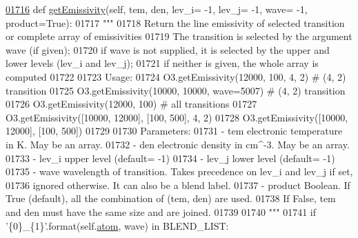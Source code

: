 \begin{DoxyCode}
\hypertarget{classpyneb_1_1core_1_1pynebcore_1_1_atom_l01716}{}\hyperlink{classpyneb_1_1core_1_1pynebcore_1_1_atom_aaf4e84a9d5f835e6284bd9302314f775}{01716}     \textcolor{keyword}{def }\hyperlink{classpyneb_1_1core_1_1pynebcore_1_1_atom_aaf4e84a9d5f835e6284bd9302314f775}{getEmissivity}(self, tem, den, lev\_i= -1, lev\_j= -1, wave= -1, product=True):
01717         \textcolor{stringliteral}{"""}
01718 \textcolor{stringliteral}{        Return the line emissivity of selected transition or complete array of emissivities}
01719 \textcolor{stringliteral}{        The transition is selected by the argument wave (if given); }
01720 \textcolor{stringliteral}{        if wave is not supplied, it is selected by the upper and lower levels (lev\_i and lev\_j); }
01721 \textcolor{stringliteral}{        if neither is given, the whole array is computed}
01722 \textcolor{stringliteral}{        }
01723 \textcolor{stringliteral}{        Usage:      }
01724 \textcolor{stringliteral}{            O3.getEmissivity(12000, 100, 4, 2)         # (4, 2) transition}
01725 \textcolor{stringliteral}{            O3.getEmissivity(10000, 10000, wave=5007)  # (4, 2) transition}
01726 \textcolor{stringliteral}{            O3.getEmissivity(12000, 100)               # all transitions}
01727 \textcolor{stringliteral}{            O3.getEmissivity([10000, 12000], [100, 500], 4, 2)}
01728 \textcolor{stringliteral}{            O3.getEmissivity([10000, 12000], [100, 500])}
01729 \textcolor{stringliteral}{            }
01730 \textcolor{stringliteral}{        Parameters:}
01731 \textcolor{stringliteral}{            - tem      electronic temperature in K. May be an array.}
01732 \textcolor{stringliteral}{            - den      electronic density in cm^-3. May be an array.}
01733 \textcolor{stringliteral}{            - lev\_i    upper level (default= -1)}
01734 \textcolor{stringliteral}{            - lev\_j    lower level (default= -1)}
01735 \textcolor{stringliteral}{            - wave     wavelength of transition. Takes precedence on lev\_i and lev\_j if set, }
01736 \textcolor{stringliteral}{                        ignored otherwise. It can also be a blend label.}
01737 \textcolor{stringliteral}{            - product  Boolean. If True (default), all the combination of (tem, den) are used. }
01738 \textcolor{stringliteral}{                         If False, tem and den must have the same size and are joined.}
01739 \textcolor{stringliteral}{}
01740 \textcolor{stringliteral}{        """}
01741         \textcolor{keywordflow}{if} \textcolor{stringliteral}{'\{0\}\_\{1\}'}.format(self.\hyperlink{classpyneb_1_1core_1_1pynebcore_1_1_atom_a192f3e20446d7fba81d789bc705d6c71}{atom}, wave) \textcolor{keywordflow}{in} BLEND\_LIST:

\end{DoxyCode}
